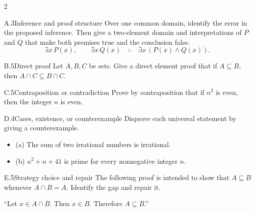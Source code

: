 \documentclass[9pt]{extarticle}
\begin{document}
\begin{multicols}{2}
\begin{CoreProblem}{A.3}{Inference and proof structure}
Over one common domain, identify the error in the proposed inference. Then give
a two-element domain and interpretations of $P$ and $Q$ that make both premises
true and the conclusion false.
\[
\exists x\,P(x),\qquad \exists x\,Q(x)
\quad\therefore\quad
\exists x\,(P(x)\land Q(x)).
\]
\end{CoreProblem}
\begin{CoreProblem}{B.5}{Direct proof}
Let $A,B,C$ be sets. Give a direct element proof that if $A\subseteq B$, then
$A\cap C\subseteq B\cap C$.
\end{CoreProblem}
\begin{CoreProblem}{C.5}{Contraposition or contradiction}
Prove by contraposition that if $n^2$ is even, then the integer $n$ is even.
\end{CoreProblem}
\columnbreak
\begin{CoreProblem}{D.4}{Cases, existence, or counterexample}
Disprove each universal statement by giving a counterexample.
\begin{itemize}
  \item (a) The sum of two irrational numbers is irrational.
  \item (b) $n^2+n+41$ is prime for every nonnegative integer $n$.
\end{itemize}
\end{CoreProblem}
\begin{CoreProblem}{E.5}{Strategy choice and repair}
The following proof is intended to show that $A\subseteq B$ whenever
$A\cap B=A$. Identify the gap and repair it.

``Let $x\in A\cap B$. Then $x\in B$. Therefore $A\subseteq B$.''
\end{CoreProblem}
\end{multicols}
\CoreWorkArea
\FormBreak
{}
\end{document}
